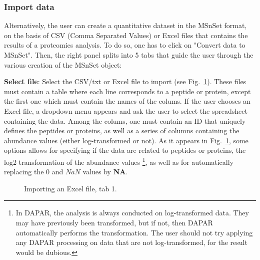 \documentclass[12pt]{article}
\begin{document}
\subsubsection{Import data}\label{sec:import}
{Alternatively, the user can create a quantitative dataset in the MSnSet format, on the basis of CSV (Comma Separated Values) or Excel files that contains the results of a proteomics analysis. To do so, one has to click on "Convert data to MSnSet". Then, the right panel splits into 5 tabs that guide the user through the various creation of the MSnSet object:}

\textbf {Select file}: Select the CSV/txt or Excel file to import (see Fig.~\ref{fig:imp1}). These files must contain a table where each line corresponds to a peptide or protein, except the first one which must contain the names of the colums. 
If the user chooses an Excel file, a dropdown menu appears and ask the user to select the spreadsheet containing the data. Among the colums, one must contain an ID that uniquely defines the peptides or proteins, as well as a series of columns containing the abundance values (either log-transformed or not). As it appears in Fig.~\ref{fig:imp1}, some options allows for specifying if the data are related to peptides or proteins, the log2 transformation of the abundance values \footnote{In DAPAR, the analysis is always conducted on log-transformed data. They may have previously been transformed, but if not, then DAPAR automatically performs the transformation. The user should not try applying any DAPAR processing on data that are not log-transformed, for the result would be dubious.}, as well as for automatically replacing the $0$ and $NaN$ values by \textbf{NA}. %
\begin {figure}
\centering
{}
\caption{Importing an Excel file, tab 1.}\label{fig:imp1}
\end {figure}
\end{document}
